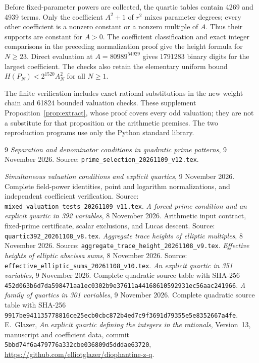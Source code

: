 \documentclass[11pt,a4paper]{article}
\theoremstyle{remark}\newtheorem{remark}[theorem]{Remark}
\begin{document}
Before fixed-parameter powers are collected, the quartic tables contain
4269 and 4939 terms. Only the coefficient $A^2+1$ of $r^2$ mixes
parameter degrees; every other coefficient is a nonzero constant or a
nonzero multiple of $A$. Thus their supports are constant for $A>0$.
The coefficient classification and exact integer comparisons in the
preceding normalization proof give the height formula for $N\ge23$.
Direct evaluation at $A=80989^{54929}$ gives 1791283 binary digits for
the largest coefficient. The checks also retain the elementary uniform
bound $H(P_N)<2^{1520}A_N^2$ for all $N\ge1$.

The finite verification includes exact rational substitutions in the
new weight chain and 61824 bounded valuation checks. These supplement
Proposition~\ref{prop:extract}, whose proof covers every odd valuation;
they are not a substitute for that proposition or the arithmetic premises.
The two reproduction programs use only the Python standard library.

\begin{thebibliography}{9}
\emph{Separation and denominator conditions in quadratic prime patterns},
9 November 2026.
Source: \nolinkurl{prime_selection_20261109_v12.tex}.

\emph{Simultaneous valuation conditions and explicit quartics},
9 November 2026. Complete field-power identities, point and logarithm
normalizations, and independent coefficient verification.
Source: \nolinkurl{mixed_valuation_tests_20261109_v11.tex}.
\emph{A forced prime condition and an explicit quartic in 392 variables},
8 November 2026. Arithmetic input contract, fixed-prime certificate,
scalar exclusions, and Lucas descent.
Source: \nolinkurl{quartic392_20261108_v8.tex}.
\emph{Aggregate trace heights of elliptic multiples}, 8 November 2026.
Source: \nolinkurl{aggregate_trace_height_20261108_v9.tex}.
\emph{Effective heights of elliptic abscissa sums}, 8 November 2026.
Source: \nolinkurl{effective_elliptic_sums_20261108_v10.tex}.
\emph{An explicit quartic in 351 variables}, 9 November 2026.
Complete quadratic source table with SHA-256
\nolinkurl{452d063b6d7da598471aa1ec0302b9e37611a44168610592931ec56aac241966}.
\emph{A family of quartics in 301 variables}, 9 November 2026.
Complete quadratic source table with SHA-256
\nolinkurl{9917be941135778816ce25ecb0cbc872b4ed7c9f3691d79355e5e8352667a4fe}.
E.~Glazer, \emph{An explicit quartic defining the integers in the rationals},
Version~13, manuscript and coefficient data, commit
\nolinkurl{5bbd74f6a479776a332cbe036809d5dddae63720},
\url{https://github.com/elliotglazer/diophantine-z-q}.
\end{thebibliography}
\end{document}
